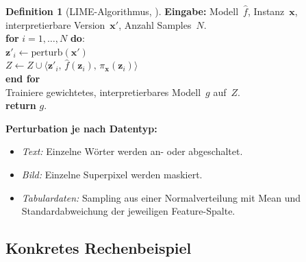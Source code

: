 ﻿\documentclass[a4paper,12pt]{article}
\theoremstyle{definition}
\newtheorem{definition}{Definition}[section]
\begin{document}
\begin{definition}[LIME-Algorithmus, \citealt{Ribeiro2016}]
  \label{def:lime_algo}
  \hfill
  \textbf{Eingabe:} Modell~$\hat{f}$, Instanz~$\mathbf{x}$, interpretierbare
  Version~$\mathbf{x}'$, Anzahl Samples~$N$.\\[4pt]
  \textbf{for} $i = 1, \ldots, N$ \textbf{do}:\\
  \quad $\mathbf{z}'_i \leftarrow \mathrm{perturb}(\mathbf{x}')$\\
  \quad $Z \leftarrow Z \cup \langle \mathbf{z}'_i,\, \hat{f}(\mathbf{z}_i),\, \pi_\mathbf{x}(\mathbf{z}_i)\rangle$\\
  \textbf{end for}\\[4pt]
  Trainiere gewichtetes, interpretierbares Modell~$g$ auf~$Z$.\\
  \textbf{return} $g$.
\end{definition}

\textbf{Perturbation je nach Datentyp:}
\begin{itemize}
  \item \emph{Text:} Einzelne Wörter werden an- oder abgeschaltet.
  \item \emph{Bild:} Einzelne Superpixel werden maskiert.
  \item \emph{Tabulardaten:} Sampling aus einer Normalverteilung mit
        Mean und Standardabweichung der jeweiligen Feature-Spalte.
\end{itemize}

\subsection{Konkretes Rechenbeispiel}
\end{document}
